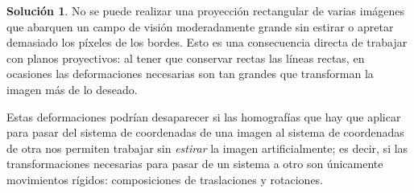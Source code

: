 \documentclass[a4paper, 11pt]{article}
\theoremstyle{definition}
\newtheorem*{solucion}{Solución}
\theoremstyle{theorem}
\begin{document}
  \begin{solucion}
      No se puede realizar una proyección rectangular de varias imágenes que abarquen un campo de visión moderadamente grande sin estirar o apretar demasiado los píxeles de los bordes. Esto es una consecuencia directa de trabajar con planos proyectivos: al tener que conservar rectas las líneas rectas, en ocasiones las deformaciones necesarias son tan grandes que transforman la imagen más de lo deseado.

      Estas deformaciones podrían desaparecer si las homografías que hay que aplicar para pasar del sistema de coordenadas de una imagen al sistema de coordenadas de otra nos permiten trabajar sin \emph{estirar} la imagen artificialmente; es decir, si las transformaciones necesarias para pasar de un sistema a otro son únicamente movimientos rígidos: composiciones de traslaciones y rotaciones.
  \end{solucion}
\end{document}
